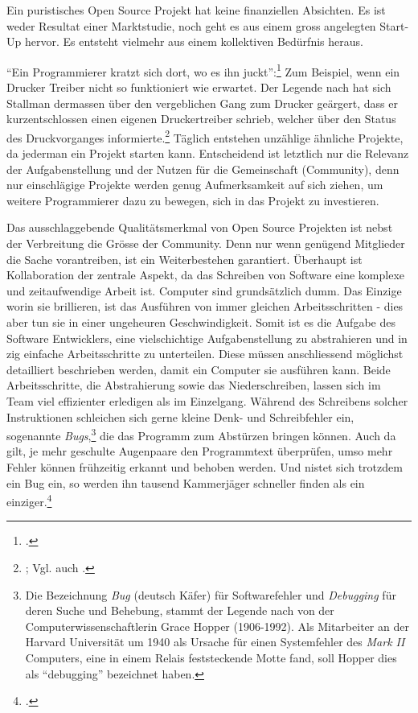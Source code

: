 \documentclass[
paper=164mm:234mm, %
pagesize, %
DIV=calc, %
10pt, %
parskip=half- %
]{scrbook}
\begin{document}
Ein puristisches Open Source Projekt hat keine finanziellen Absichten. Es ist weder Resultat einer Marktstudie, noch geht es aus einem gross angelegten Start-Up hervor. Es entsteht vielmehr aus einem kollektiven Bedürfnis heraus.

\enquote{Ein Programmierer kratzt sich dort, wo es ihn juckt}:\footnote{\cite[4]{Raymond:2001}.} Zum Beispiel, wenn ein Drucker Treiber nicht so funktioniert wie erwartet. Der Legende nach hat sich Stallman dermassen über den vergeblichen Gang zum Drucker geärgert, dass er kurzentschlossen einen eigenen Druckertreiber schrieb, welcher über den Status des Druckvorganges informierte.\footnote{\cite[32]{Raymond:1999}; Vgl. auch \cite[9]{Stallman:2010}.} Täglich entstehen unzählige ähnliche Projekte, da jederman ein Projekt starten kann. Entscheidend ist letztlich nur die Relevanz der Aufgabenstellung und der Nutzen für die Gemeinschaft (Community), denn nur einschlägige Projekte werden genug Aufmerksamkeit auf sich ziehen, um weitere Programmierer dazu zu bewegen, sich in das Projekt zu investieren.

Das ausschlaggebende Qualitätsmerkmal von Open Source Projekten ist nebst der Verbreitung die Grösse der Community. Denn nur wenn genügend Mitglieder die Sache vorantreiben, ist ein Weiterbestehen garantiert. Überhaupt ist Kollaboration der zentrale Aspekt, da das Schreiben von Software eine komplexe und zeitaufwendige Arbeit ist. Computer sind grundsätzlich dumm. Das Einzige worin sie brillieren, ist das Ausführen von immer gleichen Arbeitsschritten - dies aber tun sie in einer ungeheuren Geschwindigkeit. Somit ist es die Aufgabe des Software Entwicklers, eine vielschichtige Aufgabenstellung zu abstrahieren und in zig einfache Arbeitsschritte zu unterteilen. Diese müssen anschliessend möglichst detailliert beschrieben werden, damit ein Computer sie ausführen kann. Beide Arbeitsschritte, die Abstrahierung sowie das Niederschreiben, lassen sich im Team viel effizienter erledigen als im Einzelgang. Während des Schreibens solcher Instruktionen schleichen sich gerne kleine Denk- und Schreibfehler ein, sogenannte \emph{Bugs},\footnote{Die Bezeichnung \emph{Bug} (deutsch Käfer) für Softwarefehler und \emph{Debugging} für deren Suche und Behebung, stammt der Legende nach von der Computerwissenschaftlerin Grace Hopper (1906-1992). Als Mitarbeiter an der Harvard Universität um 1940 als Ursache für einen Systemfehler des \emph{Mark II} Computers, eine in einem Relais feststeckende Motte fand, soll Hopper dies als \enquote{debugging} bezeichnet haben.} die das Programm zum Abstürzen bringen können. Auch da gilt, je mehr geschulte Augenpaare den Programmtext überprüfen, umso mehr Fehler können frühzeitig erkannt und behoben werden. Und nistet sich trotzdem ein Bug ein, so werden ihn tausend Kammerjäger schneller finden als ein einziger.\footnote{\cite[235-254]{Grassmuck:2004}.}
\end{document}
